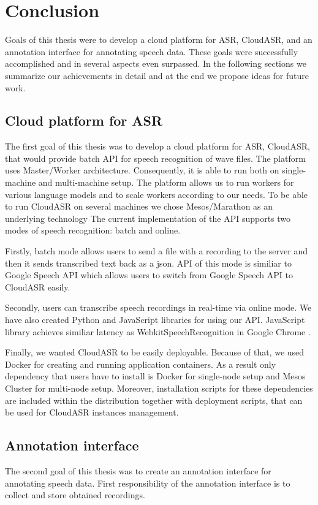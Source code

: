 \chapter*{Conclusion}

Goals of this thesis were to develop a cloud platform for ASR, CloudASR,
  and an annotation interface for annotating speech data.
These goals were successfully accomplished and in several aspects even surpassed.
In the following sections we summarize our achievements in detail and
  at the end we propose ideas for future work.

\section*{Cloud platform for ASR}
The first goal of this thesis was to develop a cloud platform for ASR, CloudASR,
  that would provide batch API for speech recognition of wave files.
The platform uses Master/Worker architecture.
Consequently, it is able to run both on single-machine and multi-machine setup.
The platform allows us to run workers for various language models and to scale workers according to our needs.
To be able to run CloudASR on several machines we chose Mesos/Marathon as an underlying technology
The current implementation of the API supports two modes of speech recognition: batch and online.

Firstly, batch mode allows users to send a file with a recording to the server
  and then it sends transcribed text back as a json.
API of this mode is similiar to Google Speech API
  which allows users to switch from Google Speech API to CloudASR easily.

Secondly, users can transcribe speech recordings in real-time via online mode.
We have also created Python and JavaScript libraries for using our API.
JavaScript library achieves similiar latency as WebkitSpeechRecognition in Google Chrome .


Finally, we wanted CloudASR to be easily deployable.
Because of that, we used Docker for creating and running application containers.
As a result only dependency that users have to install is Docker for single-node setup and Mesos Cluster for multi-node setup.
Moreover, installation scripts for these dependencies are included within the distribution together with deployment scripts,
  that can be used for CloudASR instances management.

\section*{Annotation interface}
The second goal of this thesis was to create an annotation interface for annotating speech data.
First responsibility of the annotation interface is to collect and store obtained recordings.

